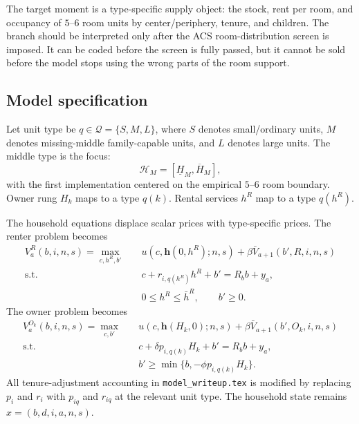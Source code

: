 \documentclass[11pt]{article}
\newcommand{\Hset}{\mathcal H}
\newcommand{\Qset}{\mathcal Q}
\begin{document}
The target moment is a type-specific supply object: the stock, rent per room, and occupancy of $5$--$6$ room units by center/periphery, tenure, and children. The branch should be interpreted only after the ACS room-distribution screen is imposed. It can be coded before the screen is fully passed, but it cannot be sold before the model stops using the wrong parts of the room support.

\subsection{Model specification}

Let unit type be $q\in\Qset=\{S,M,L\}$, where $S$ denotes small/ordinary units, $M$ denotes missing-middle family-capable units, and $L$ denotes large units. The middle type is the focus:
\begin{equation}
    \Hset_M=[\underline H_M,\overline H_M],
\end{equation}
with the first implementation centered on the empirical $5$--$6$ room boundary. Owner rung $H_k$ maps to a type $q(k)$. Rental services $h^R$ map to a type $q(h^R)$.

The household equations displace scalar prices with type-specific prices. The renter problem becomes
\begin{equation}
\begin{aligned}
V^R_a(b,i,n,s)=
\max_{c,h^R,b'}\quad
&u(c,\mathbf h(0,h^R);n,s)
+\beta \bar V_{a+1}(b',R,i,n,s)\\
\text{s.t.}\quad
&c+r_{i,q(h^R)}h^R+b'=R_b b+y_a,\\
&0\leq h^R\leq \bar h^R,\qquad b'\geq0.
\end{aligned}
\label{eq:developer-renter}
\end{equation}
The owner problem becomes
\begin{equation}
\begin{aligned}
V^{O_k}_a(b,i,n,s)=
\max_{c,b'}\quad
&u(c,\mathbf h(H_k,0);n,s)
+\beta \bar V_{a+1}(b',O_k,i,n,s)\\
\text{s.t.}\quad
&c+\delta p_{i,q(k)}H_k+b'=R_b b+y_a,\\
&b'\geq \min\{b,-\phi p_{i,q(k)}H_k\}.
\end{aligned}
\label{eq:developer-owner}
\end{equation}
All tenure-adjustment accounting in \texttt{model\_writeup.tex} is modified by replacing $p_i$ and $r_i$ with $p_{iq}$ and $r_{iq}$ at the relevant unit type. The household state remains $x=(b,d,i,a,n,s)$.
\end{document}
